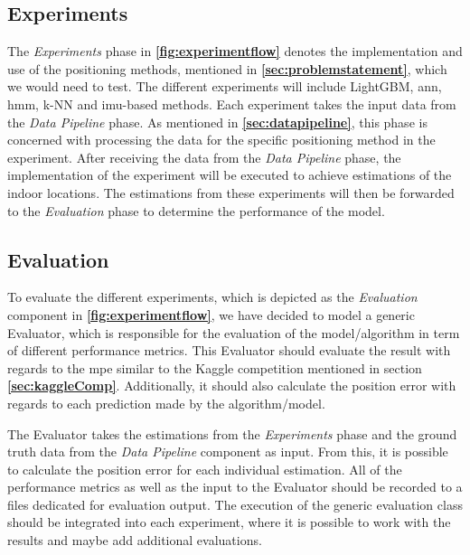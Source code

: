 \subsection{Experiments}
The \textit{Experiments} phase in \textbf{\autoref{fig:experimentflow}} denotes the implementation and use of the positioning methods, mentioned in \textbf{\autoref{sec:problemstatement}}, which we would need to test. The different experiments will include LightGBM, \gls{ann}, \gls{hmm}, k-NN and \gls{imu}-based methods. Each experiment takes the input data from the \textit{Data Pipeline} phase. As mentioned in \textbf{\autoref{sec:datapipeline}}, this phase is concerned with processing the data for the specific positioning method in the experiment. After receiving the data from the \textit{Data Pipeline} phase, the implementation of the experiment will be executed to achieve estimations of the indoor locations. The estimations from these experiments will then be forwarded to the \textit{Evaluation} phase to determine the performance of the model.
%

\subsection{Evaluation}
To evaluate the different experiments, which is depicted as the \textit{Evaluation} component in \textbf{\autoref{fig:experimentflow}}, we have decided to model a generic Evaluator, which is responsible for the evaluation of the model/algorithm in term of different performance metrics.
This Evaluator should evaluate the result with regards to the \gls{mpe} similar to the Kaggle competition mentioned in section \textbf{\autoref{sec:kaggleComp}}. Additionally, it should also calculate the position error with regards to each prediction made by the algorithm/model.

The Evaluator takes the estimations from the \textit{Experiments} phase and the ground truth data from the \textit{Data Pipeline} component as input. From this, it is possible to calculate the position error for each individual estimation. All of the performance metrics as well as the input to the Evaluator should be recorded to a files dedicated for evaluation output. The execution of the generic evaluation class should be integrated into each experiment, where it is possible to work with the results and maybe add additional evaluations.

